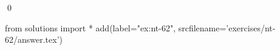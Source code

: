 
\begin{ex} 
  \label{ex:nt-62}
  
  \qed
\end{ex} 
\begin{python0}
from solutions import *
add(label="ex:nt-62",
    srcfilename='exercises/nt-62/answer.tex') 
\end{python0}
